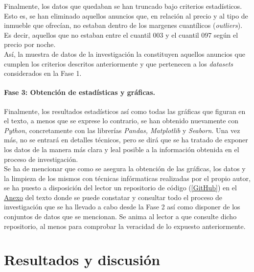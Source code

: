 \documentclass[a4paper,10pt]{article}
\begin{document}
\begin{multicols}{2}
            \noindent
            Finalmente, los datos que quedaban se han truncado bajo criterios estadísticos. Esto es, se han eliminado aquellos anuncios que, en relación al
            precio y al tipo de inmueble que ofrecían, no estaban dentro de los margenes cuantílicos (\textit{outliers}). Es decir, aquellos que no estaban entre
            el cuantil 003 y el cuantil 097 según el precio por noche. \\

            \noindent
            Así, la muestra de datos de la investigación la constituyen aquellos anuncios que cumplen los criterios descritos anteriormente y que 
            pertenecen a los \textit{datasets} considerados en la Fase 1.

            \clearpage
            \paragraph*{\textbf{Fase 3: Obtención de estadísticas y gráficas.}}
            Finalmente, los resultados estadísticos así como todas las gráficas que figuran en 
            el texto, a menos que se exprese lo contrario, se han obtenido nuevamente con \emph{Python}, concretamente con las librerías \emph{Pandas, 
            Matplotlib} y \emph{Seaborn}. Una vez más, no se entrará en detalles técnicos, pero se dirá que se ha tratado de exponer los datos de la manera más 
            clara y leal posible a la información obtenida en el proceso de investigación. \\

            \noindent
            Se ha de mencionar que como se asegura la obtención de las gráficas, los datos y la limpieza de los mismos con técnicas infórmaticas realizadas por el 
            propio autor, se ha puesto a disposición del lector un repositorio de código (\hyperlink{github}{[GitHub]}) en el \hyperlink{anexo}{Anexo} 
            del texto donde se puede constatar y consultar todo el proceso de investigación que se ha llevado a cabo desde la Fase 2 así como disponer de los conjuntos de datos que se mencionan. Se anima al lector a que consulte dicho repositorio, al menos para comprobar la veracidad de lo expuesto     anteriormente.

    \end{multicols}
    \setlength{\columnsep}{10pt}

    \section{Resultados y discusión}
\end{document}
